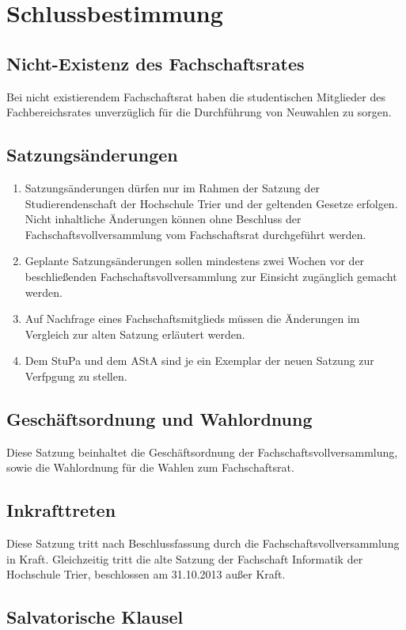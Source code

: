 \section{Schlussbestimmung}
\subsection{Nicht-Existenz des Fachschaftsrates}
Bei nicht existierendem Fachschaftsrat haben die studentischen Mitglieder des Fachbereichsrates unverzüglich für die Durchführung von Neuwahlen zu sorgen.

\subsection{Satzungsänderungen}
\begin{enumerate}
\item Satzungsänderungen dürfen nur im Rahmen der Satzung der Studierendenschaft der Hochschule Trier und der geltenden Gesetze erfolgen. Nicht inhaltliche Änderungen können ohne Beschluss der Fachschaftsvollversammlung vom Fachschaftsrat durchgeführt werden.
\item Geplante Satzungsänderungen sollen mindestens zwei Wochen vor der beschließenden Fachschaftsvollversammlung zur Einsicht zugänglich gemacht werden.
\item Auf Nachfrage eines Fachschaftsmitglieds müssen die Änderungen im Vergleich zur alten Satzung erläutert werden.
\item Dem StuPa und dem AStA sind je ein Exemplar der neuen Satzung zur Verfpgung zu stellen.
\end{enumerate}

\subsection{Geschäftsordnung und Wahlordnung}
Diese Satzung beinhaltet die Geschäftsordnung der Fachschaftsvollversammlung, sowie die Wahlordnung für die Wahlen zum Fachschaftsrat.

\subsection{Inkrafttreten}
Diese Satzung tritt nach Beschlussfassung durch die Fachschaftsvollversammlung in Kraft. Gleichzeitig tritt die alte Satzung der Fachschaft Informatik der Hochschule Trier, beschlossen am 31.10.2013 außer Kraft.

\subsection{Salvatorische Klausel}
